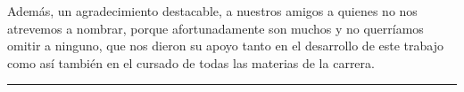 \documentclass[a4paper,11pt]{ThesisStyle}
\begin{document}
Además, un agradecimiento destacable, a nuestros amigos a quienes no nos atrevemos a nombrar, porque afortunadamente son muchos y no querríamos omitir a ninguno, que nos dieron su apoyo tanto en el desarrollo de este trabajo como así también en el cursado de todas las materias de la carrera. 
\noindent\rule[2pt]{\textwidth}{0.5pt}

\cleardoublepage

\tableofcontents

\mainmatter


\appendix
\addappheadtotoc
\appendixpage


\listoffigures
\listoftables
\listofalgorithms
{}

% 
% 



\end{document}
